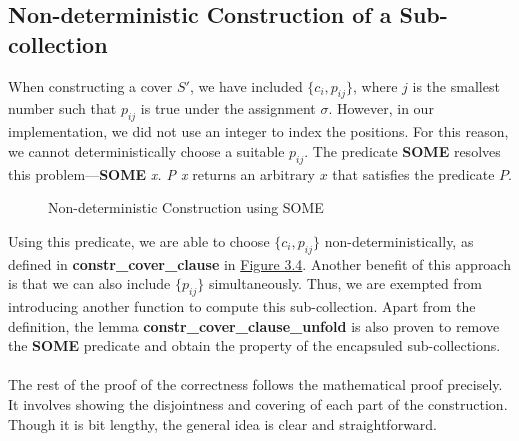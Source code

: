 \subsection*{Non-deterministic Construction of a Sub-collection}
When constructing a cover $S'$, we have included $\{c_i, p_{ij}\}$, where $j$ is the smallest number 
such that $p_{ij}$ is true under the assignment $\sigma$. However, in our implementation, 
we did not use an integer to index the positions. For this reason, we cannot deterministically choose 
a suitable $p_{ij}$. The predicate \textbf{SOME} resolves this problem---\textbf{SOME} \textit{x. P x}
returns an arbitrary $x$ that satisfies the predicate $P$.
\begin{figure}[h!]
\caption{Non-deterministic Construction using SOME}
\label{figure:7}
\end{figure} 
Using this predicate, we are able to choose $\{c_i, p_{ij}\}$ non-deterministically, as defined in \textbf{constr\_cover\_clause} in \hyperref[fig:7]{Figure 3.4}. 
Another benefit of this approach is that we can also include $\{p_{ij}\}$ simultaneously. Thus, we are exempted from introducing another function 
to compute this sub-collection. Apart from the definition, the lemma \textbf{constr\_cover\_clause\_unfold} is also proven to remove the \textbf{SOME}
predicate and obtain the property of the encapsuled sub-collections. \\\\
The rest of the proof of the correctness follows the mathematical proof precisely. 
It involves showing the disjointness and covering of each part of the construction. 
Though it is bit lengthy, the general idea is clear and straightforward.

